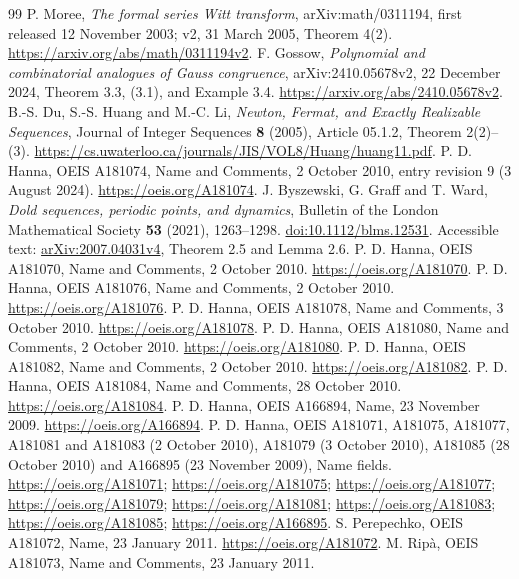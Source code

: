 \documentclass[11pt]{article}
\begin{document}
\begin{thebibliography}{99}
 P. Moree, \emph{The formal series Witt transform},
arXiv:math/0311194, first released 12 November 2003; v2, 31 March 2005,
Theorem 4(2). \url{https://arxiv.org/abs/math/0311194v2}.
 F. Gossow,
\emph{Polynomial and combinatorial analogues of Gauss congruence},
arXiv:2410.05678v2, 22 December 2024,
Theorem 3.3, (3.1), and Example 3.4.
\url{https://arxiv.org/abs/2410.05678v2}.
 B.-S. Du, S.-S. Huang and M.-C. Li,
\emph{Newton, Fermat, and Exactly Realizable Sequences},
Journal of Integer Sequences \textbf{8} (2005), Article 05.1.2,
Theorem 2(2)--(3).
\url{https://cs.uwaterloo.ca/journals/JIS/VOL8/Huang/huang11.pdf}.
 P. D. Hanna, OEIS A181074, Name and Comments, 2 October 2010,
entry revision 9 (3 August 2024). \url{https://oeis.org/A181074}.
 J. Byszewski, G. Graff and T. Ward,
\emph{Dold sequences, periodic points, and dynamics},
Bulletin of the London Mathematical Society \textbf{53} (2021), 1263--1298.
\href{https://doi.org/10.1112/blms.12531}{doi:10.1112/blms.12531}.
Accessible text: \href{https://arxiv.org/abs/2007.04031v4}{arXiv:2007.04031v4},
Theorem 2.5 and Lemma 2.6.
 P. D. Hanna, OEIS A181070, Name and Comments, 2 October 2010.
\url{https://oeis.org/A181070}.
 P. D. Hanna, OEIS A181076, Name and Comments, 2 October 2010.
\url{https://oeis.org/A181076}.
 P. D. Hanna, OEIS A181078, Name and Comments, 3 October 2010.
\url{https://oeis.org/A181078}.
 P. D. Hanna, OEIS A181080, Name and Comments, 2 October 2010.
\url{https://oeis.org/A181080}.
 P. D. Hanna, OEIS A181082, Name and Comments, 2 October 2010.
\url{https://oeis.org/A181082}.
 P. D. Hanna, OEIS A181084, Name and Comments, 28 October 2010.
\url{https://oeis.org/A181084}.
 P. D. Hanna, OEIS A166894, Name, 23 November 2009.
\url{https://oeis.org/A166894}.
 P. D. Hanna, OEIS A181071, A181075, A181077, A181081 and A181083
(2 October 2010), A181079 (3 October 2010), A181085 (28 October 2010)
and A166895 (23 November 2009), Name fields.
\url{https://oeis.org/A181071}; \url{https://oeis.org/A181075};
\url{https://oeis.org/A181077}; \url{https://oeis.org/A181079};
\url{https://oeis.org/A181081}; \url{https://oeis.org/A181083};
\url{https://oeis.org/A181085}; \url{https://oeis.org/A166895}.
 S. Perepechko, OEIS A181072, Name, 23 January 2011.
\url{https://oeis.org/A181072}.
 M. Rip\`a, OEIS A181073, Name and Comments, 23 January 2011.

\end{thebibliography}
\end{document}
